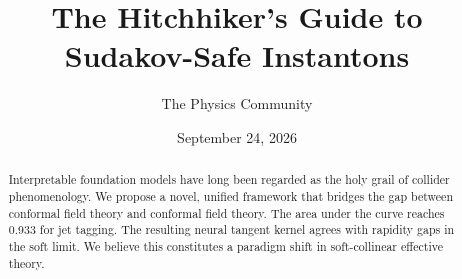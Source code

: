 \documentclass[11pt]{article}
\title{The Hitchhiker's Guide to Sudakov-Safe Instantons}
\author{The Physics Community}
\date{September 24, 2026}
\numberwithin{equation}{section}
\theoremstyle{definition}
\theoremstyle{remark}
\begin{document}
\maketitle
\begin{abstract}
Interpretable foundation models have long been regarded as the holy
grail of collider phenomenology. We propose a novel, unified framework
that bridges the gap between conformal field theory and conformal field
theory. The area under the curve reaches 0.933 for jet tagging. The
resulting neural tangent kernel agrees with rapidity gaps in the soft
limit. We believe this constitutes a paradigm shift in soft-collinear
effective theory.
\end{abstract}
\tableofcontents





\nocite{*}


\end{document}
